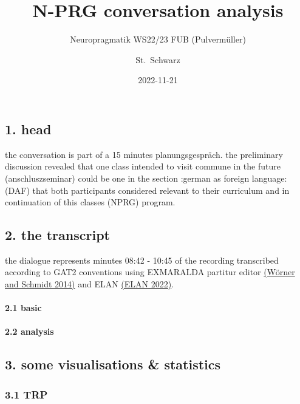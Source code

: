 \documentclass[
]{article}
\title{N-PRG conversation analysis}
\subtitle{Neuropragmatik WS22/23 FUB (Pulvermüller)}
\author{St.~Schwarz}
\date{2022-11-21}
\begin{document}
\maketitle

{
\setcounter{tocdepth}{2}
\tableofcontents
}
\hypertarget{head}{%
\subsection{1. head}\label{head}}

the conversation is part of a 15 minutes planungsgespräch. the
preliminary discussion revealed that one class intended to visit commune
in the future (anschluszseminar) could be one in the section :german as
foreign language: (DAF) that both participants considered relevant to
their curriculum and in continuation of this classes (NPRG) program.

\hypertarget{the-transcript}{%
\subsection{2. the transcript}\label{the-transcript}}

the dialogue represents minutes 08:42 - 10:45 of the recording
transcribed according to GAT2 conventions using EXMARALDA partitur
editor \href{https://exmaralda.org/de/}{(Wörner and Schmidt 2014)} and
ELAN \href{https://archive.mpi.nl/tla/elan}{(ELAN 2022)}.

\hypertarget{basic}{%
\paragraph{2.1 basic}\label{basic}}

\hypertarget{analysis}{%
\paragraph{2.2 analysis}\label{analysis}}

\hypertarget{some-visualisations-statistics}{%
\subsection{3. some visualisations \&
statistics}\label{some-visualisations-statistics}}

\hypertarget{trp}{%
\subsubsection{3.1 TRP}\label{trp}}
\end{document}
